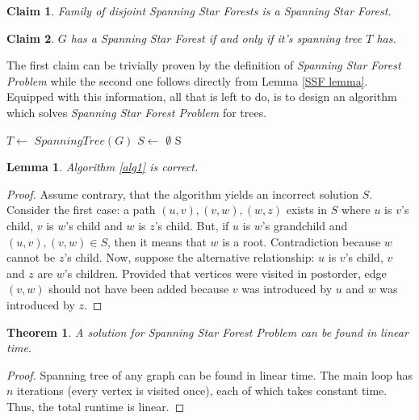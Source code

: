 \documentclass[en]{pracamgr}
\newtheorem{theorem}{Theorem}
\newtheorem{lemma}{Lemma}
\newtheorem{claim}{Claim}
\newcommand{\ssf}{\emph{Spanning Star Forest}}
\newcommand{\ssfp}{\emph{Spanning Star Forest Problem}}
\begin{document}
\begin{claim} \label{SSF sum}
	Family of disjoint {\normalfont Spanning Star Forests} is a \ssf{}.
\end{claim}

\begin{claim} \label{Spanning tree SSF}
	$G$ has a \ssf{} if and only if it's spanning tree $T$ has.
\end{claim}

The first claim can be trivially proven by the definition of \ssfp{} while the second one follows directly from Lemma \ref{SSF lemma}. Equipped with this information, all that is left to do, is to design an algorithm which solves \ssfp{} for trees.

\begin{algorithm}\label{alg1}
	$T \leftarrow$ $SpanningTree(G)$\;
	$S \leftarrow$ $\emptyset$\;
	\Return S
	\caption{Obtaining a Spanning Star Forest from a tree.}
\end{algorithm}

\begin{lemma}\label{alg1 correctness}
	Algorithm \ref{alg1} is correct.
\end{lemma}

\begin{proof}
	Assume contrary, that the algorithm yields an incorrect solution $S$. Consider
	the first case: a path $(u,v),(v,w),(w,z)$ exists in $S$ where $u$ is $v$'s 
	child, $v$ is $w$'s child and $w$ is $z$'s child. But, if $u$ is $w$'s
	grandchild and $(u,v),(v,w) \in S$, then it means that $w$ is a root. 
	Contradiction because $w$ cannot be $z$'s child.
	Now, suppose the alternative relationship: $u$ is $v$'s child, $v$ and $z$ are
	$w$'s children. Provided that vertices were visited in postorder, edge $(v,w)$
	should not have been added because $v$ was introduced by $u$ and $w$ was
	introduced by $z$.
\end{proof}

\begin{theorem}
	A solution for Spanning Star Forest Problem can be found in linear time.
\end{theorem}

\begin{proof}
	Spanning tree of any graph can be found in linear time. The main loop has $n$ 
	iterations (every vertex is visited once), each of which takes constant time.
	Thus, the total runtime is linear.
\end{proof}
\end{document}
